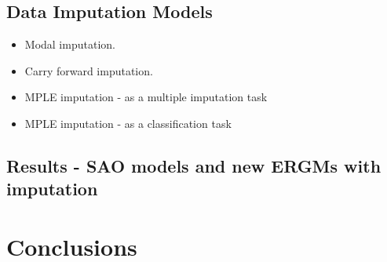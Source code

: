 \documentclass[12pt]{article} %
\numberwithin{equation}{section}		%
\numberwithin{figure}{section}			%
\numberwithin{table}{section}				%
\begin{document}
\subsection{Data Imputation Models}
\begin{itemize}
\item Modal imputation.
\item Carry forward imputation.
\item MPLE imputation - as a multiple imputation task
\item MPLE imputation - as a classification task
\end{itemize}

\subsection{Results - SAO models and new ERGMs with imputation}

\section{Conclusions}
\end{document}
